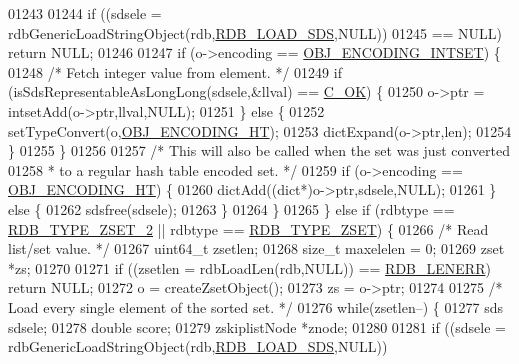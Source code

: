\begin{DoxyCode}
{{{{{{{{{{{{{{{{{{{{{{{01243 
01244             \textcolor{keywordflow}{if} ((sdsele = rdbGenericLoadStringObject(rdb,\hyperlink{rdb_8h_ad15f5cc8e1a7789cc35b66f017e98a18}{RDB\_LOAD\_SDS},NULL))
01245                 == NULL) \textcolor{keywordflow}{return} NULL;
01246 
01247             \textcolor{keywordflow}{if} (o->encoding == \hyperlink{server_8h_a214173987de21c3b7661fddd42b05873}{OBJ\_ENCODING\_INTSET}) \{
01248                 \textcolor{comment}{/* Fetch integer value from element. */}
01249                 \textcolor{keywordflow}{if} (isSdsRepresentableAsLongLong(sdsele,&llval) == \hyperlink{server_8h_a303769ef1065076e68731584e758d3e1}{C\_OK}) \{
01250                     o->ptr = intsetAdd(o->ptr,llval,NULL);
01251                 \} \textcolor{keywordflow}{else} \{
01252                     setTypeConvert(o,\hyperlink{server_8h_a9c10219f68afc557d510d108257d238b}{OBJ\_ENCODING\_HT});
01253                     dictExpand(o->ptr,len);
01254                 \}
01255             \}
01256 
01257             \textcolor{comment}{/* This will also be called when the set was just converted}
01258 \textcolor{comment}{             * to a regular hash table encoded set. */}
01259             \textcolor{keywordflow}{if} (o->encoding == \hyperlink{server_8h_a9c10219f68afc557d510d108257d238b}{OBJ\_ENCODING\_HT}) \{
01260                 dictAdd((dict*)o->ptr,sdsele,NULL);
01261             \} \textcolor{keywordflow}{else} \{
01262                 sdsfree(sdsele);
01263             \}
01264         \}
01265     \} \textcolor{keywordflow}{else} \textcolor{keywordflow}{if} (rdbtype == \hyperlink{rdb_8h_adc645c9007ce7ce91f18bc88a7ea6918}{RDB\_TYPE\_ZSET\_2} || rdbtype == 
      \hyperlink{rdb_8h_ad3e3b26518a5116df59e48fcf2a2ef68}{RDB\_TYPE\_ZSET}) \{
01266         \textcolor{comment}{/* Read list/set value. */}
01267         uint64\_t zsetlen;
01268         size\_t maxelelen = 0;
01269         zset *zs;
01270 
01271         \textcolor{keywordflow}{if} ((zsetlen = rdbLoadLen(rdb,NULL)) == \hyperlink{rdb_8h_aa66b6ad7261656029e6a67cf78432b2d}{RDB\_LENERR}) \textcolor{keywordflow}{return} NULL;
01272         o = createZsetObject();
01273         zs = o->ptr;
01274 
01275         \textcolor{comment}{/* Load every single element of the sorted set. */}
01276         \textcolor{keywordflow}{while}(zsetlen--) \{
01277             sds sdsele;
01278             \textcolor{keywordtype}{double} score;
01279             zskiplistNode *znode;
01280 
01281             \textcolor{keywordflow}{if} ((sdsele = rdbGenericLoadStringObject(rdb,\hyperlink{rdb_8h_ad15f5cc8e1a7789cc35b66f017e98a18}{RDB\_LOAD\_SDS},NULL))
}}}}}}}}}}}}}}}}}}}}}}}
\end{DoxyCode}
